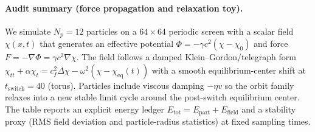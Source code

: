 \paragraph{Audit summary (force propagation and relaxation toy).} \AuditTag We simulate $N_p=12$ particles on a $64\times64$ periodic screen with a scalar field $\chi(x,t)$ that generates an effective potential $\Phi=-\gamma c^2(\chi-\chi_0)$ and force $F=-\nabla\Phi=\gamma c^2\nabla\chi$. The field follows a damped Klein--Gordon/telegraph form $\chi_{tt}+\alpha\chi_t=c_f^2\Delta\chi-\omega^2(\chi-\chi_{\mathrm{eq}}(t))$ with a smooth equilibrium-center shift at $t_\mathrm{switch}=40$ (torus). Particles include viscous damping $-\eta v$ so the orbit family relaxes into a new stable limit cycle around the post-switch equilibrium center. The table reports an explicit energy ledger $E_\mathrm{tot}=E_\mathrm{part}+E_\mathrm{field}$ and a stability proxy (RMS field deviation and particle-radius statistics) at fixed sampling times.